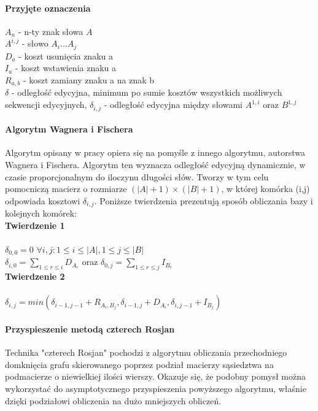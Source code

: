\paragraph{Przyjęte oznaczenia}

$A_n$ - n-ty znak słowa $A$\\
$A^{i,j}$ - słowo $A_i...A_j$\\
$D_a$ - koszt usunięcia znaku a\\
$I_a$ - koszt wstawienia znaku a\\
$R_{a,b}$ - koszt zamiany znaku a na znak b\\
$\delta$ - odległość edycyjna, minimum po sumie kosztów wszystkich możliwych sekwencji edycyjnych,
$\delta_{i,j}$ - odległość edycyjna między słowami $A^{1,i}$ oraz $B^{1,j}$\\

\paragraph{Algorytm Wagnera i Fischera}

Algorytm opisany w pracy opiera się na pomyśle z innego algorytmu, autorstwa Wagnera i Fischera. Algorytm ten wyznacza odległość edycyjną dynamicznie, w czasie proporcjonalnym do iloczynu długości słów. Tworzy w tym celu pomocniczą macierz o rozmiarze $(|A|+1) \times (|B|+1)$, w której komórka (i,j) odpowiada kosztowi $\delta_{i,j}$. Poniższe twierdzenia prezentują sposób obliczania bazy i kolejnych komórek:\\

\textbf{Twierdzenie 1}\\\\
$\delta_{0,0} = 0$ $\forall i,j : 1 \leq i \leq |A|, 1 \leq j \leq |B|$\\
$\delta_{i,0} = \sum_{1 \leq r \leq i}D_{A_r}$ oraz
$\delta_{0,j} = \sum_{1 \leq r \leq j}I_{B_r}$\\

\textbf{Twierdzenie 2}\\\\
$\delta_{i, j} = min(\delta_{i-1,j-1}+R_{A_i,B_j}, \delta_{i-1,j}+D_{A_i}, \delta_{i,j-1}+I_{B_j})$

\paragraph{Przyspieszenie metodą czterech Rosjan}

Technika "czterech Rosjan" pochodzi z algorytmu obliczania przechodniego domknięcia grafu skierowanego poprzez podział macierzy sąsiedztwa na podmacierze o niewielkiej ilości wierszy. Okazuje się, że podobny pomysł można wykorzystać do asymptotycznego przyspieszenia powyższego algorytmu, właśnie dzięki podziałowi obliczenia na dużo mniejszych obliczeń.\\

